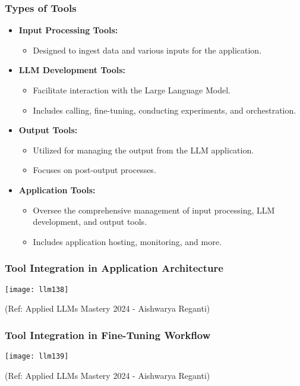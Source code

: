 \begin{frame}[fragile]\frametitle{Types of Tools}
  \begin{itemize}
    \item \textbf{Input Processing Tools:}
      \begin{itemize}
        \item Designed to ingest data and various inputs for the application.
      \end{itemize}
    \item \textbf{LLM Development Tools:}
      \begin{itemize}
        \item Facilitate interaction with the Large Language Model.
        \item Includes calling, fine-tuning, conducting experiments, and orchestration.
      \end{itemize}
    \item \textbf{Output Tools:}
      \begin{itemize}
        \item Utilized for managing the output from the LLM application.
        \item Focuses on post-output processes.
      \end{itemize}
    \item \textbf{Application Tools:}
      \begin{itemize}
        \item Oversee the comprehensive management of input processing, LLM development, and output tools.
        \item Includes application hosting, monitoring, and more.
      \end{itemize}
  \end{itemize}
\end{frame}


\begin{frame}[fragile]\frametitle{Tool Integration in Application Architecture}
\begin{center}
\texttt{[image: llm138]}
\end{center}				

{\tiny (Ref: Applied LLMs Mastery 2024 - Aishwarya Reganti)}
\end{frame}

\begin{frame}[fragile]\frametitle{Tool Integration in Fine-Tuning Workflow}
\begin{center}
\texttt{[image: llm139]}
\end{center}				

{\tiny (Ref: Applied LLMs Mastery 2024 - Aishwarya Reganti)}
\end{frame}


